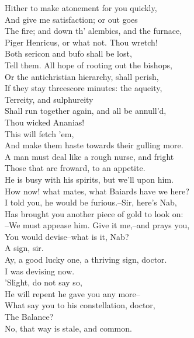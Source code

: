 \documentclass{memoir}
\begin{document}
\begin{drama*}
 Hither to make atonement for you quickly,\\
 And give me satisfaction; or out goes\\
 The fire; and down th' alembics, and the furnace,\\
 Piger Henricus, or what not. Thou wretch!\\
 Both sericon and bufo shall be lost,\\
 Tell them. All hope of rooting out the bishops,\\
 Or the antichristian hierarchy, shall perish,\\
 If they stay threescore minutes: the aqueity,\\
 Terreity, and sulphureity\\
 Shall run together again, and all be annull'd,\\
 Thou wicked Ananias!\\
 This will fetch 'em,\\
 And make them haste towards their gulling more.\\
 A man must deal like a rough nurse, and fright\\
 Those that are froward, to an appetite.\\
\facespeaks  He is busy with his spirits, but we'll upon him.\\
\subtlespeaks  How now! what mates, what Baiards have we here?\\
\facespeaks  I told you, he would be furious.--Sir, here's Nab,\\
 Has brought you another piece of gold to look on:\\
 --We must appease him. Give it me,--and prays you,\\
 You would devise--what is it, Nab?\\
\druggerspeaks {} A sign, sir.\\
\facespeaks  Ay, a good lucky one, a thriving sign, doctor.\\
\subtlespeaks  I was devising now.\\
\facespeaks {} 'Slight, do not say so,\\
 He will repent he gave you any more--\\
 What say you to his constellation, doctor,\\
 The Balance?\\
\subtlespeaks {} No, that way is stale, and common.\\

\end{drama*}
\end{document}
